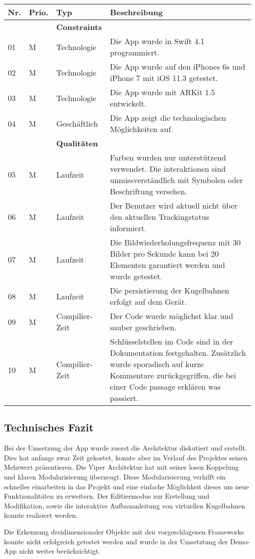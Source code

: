\begin{longtable}{l l l p{10cm}}
	\hline
	\textbf{Nr.} & \textbf{Prio.} & \textbf{Typ} & \textbf{Beschreibung} \\
	\hline
	 & & \textbf{Constraints} & \\
	\hline
	01 & M & Technologie & Die App wurde in Swift 4.1 programmiert. \\
	\hline
	02 & M & Technologie & Die App wurde auf den iPhones 6s und iPhone 7 mit iOS 11.3 getestet. \\
	\hline
	03 & M & Technologie & Die App wurde mit ARKit 1.5 entwickelt. \\
	\hline
	04 & M & Geschäftlich & Die App zeigt die technologischen Möglichkeiten auf. \\
	\hline
	 & & \textbf{Qualitäten}& \\
	\hline
	05 & M & Laufzeit & Farben wurden nur unterstützend verwendet. Die interaktionen sind unmissverständlich mit Symbolen oder Beschriftung versehen. \\ 
	\hline
	06 & M & Laufzeit & Der Benutzer wird aktuell nicht über den aktuellen Trackingstatus informiert. \\
	\hline
	07 & M & Laufzeit & Die Bildwiederholungsfrequenz mit 30 Bilder pro Sekunde kann bei 20 Elementen garantiert werden und wurde getestet. \\
	\hline
	08 & M & Laufzeit & Die persistierung der Kugelbahnen erfolgt auf dem Gerät. \\
	\hline
	09 & M & Compilier-Zeit & Der Code wurde möglichst klar und sauber geschrieben. \\
	\hline
	10 & M & Compilier-Zeit & Schlüsselstellen im Code sind in der Dokumentation festgehalten. Zusätzlich wurde sporadisch auf kurze Kommentare zurückgegriffen, die bei einer Code passage erklären was passiert. \\
	\hline
\end{longtable}


\subsection{Technisches Fazit}
Bei der Umsetzung der App wurde zuerst die Architektur diskutiert und erstellt. Dies hat anfangs zwar Zeit gekostet, konnte aber im Verlauf des Projektes seinen Mehrwert präsentieren. Die Viper Architektur hat mit seiner losen Koppelung und klaren Modularisierung überzeugt. Diese Modularisierung verhilft ein schnelles einarbeiten in das Projekt und eine einfache Möglichkeit dieses um neue Funktionalitäten zu erweitern. Der Editiermodus zur Erstellung und Modifikation, sowie die interaktive Aufbauanleitung von virtuellen Kugelbahnen konnte realisiert werden.

Die Erkennung dreidimensionaler Objekte mit den vorgeschlagenen Frameworks konnte nicht erfolgreich getestet werden und wurde in der Umsetztung der Demo-App nicht weiter berücksichtigt.
